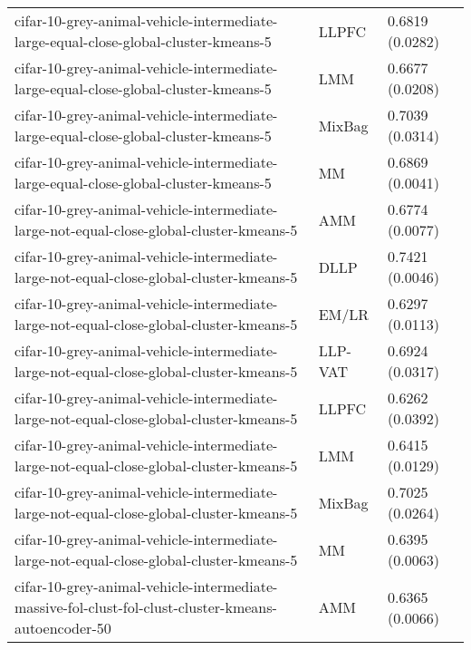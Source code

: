 \begin{longtable}{lll}
                          cifar-10-grey-animal-vehicle-intermediate-large-equal-close-global-cluster-kmeans-5 &     LLPFC &                       0.6819 (0.0282) \\
                          cifar-10-grey-animal-vehicle-intermediate-large-equal-close-global-cluster-kmeans-5 &       LMM &                       0.6677 (0.0208) \\
                          cifar-10-grey-animal-vehicle-intermediate-large-equal-close-global-cluster-kmeans-5 &    MixBag &                       0.7039 (0.0314) \\
                          cifar-10-grey-animal-vehicle-intermediate-large-equal-close-global-cluster-kmeans-5 &        MM &                       0.6869 (0.0041) \\
                      cifar-10-grey-animal-vehicle-intermediate-large-not-equal-close-global-cluster-kmeans-5 &       AMM &                       0.6774 (0.0077) \\
                      cifar-10-grey-animal-vehicle-intermediate-large-not-equal-close-global-cluster-kmeans-5 &      DLLP &                       0.7421 (0.0046) \\
                      cifar-10-grey-animal-vehicle-intermediate-large-not-equal-close-global-cluster-kmeans-5 &     EM/LR &                       0.6297 (0.0113) \\
                      cifar-10-grey-animal-vehicle-intermediate-large-not-equal-close-global-cluster-kmeans-5 &   LLP-VAT &                       0.6924 (0.0317) \\
                      cifar-10-grey-animal-vehicle-intermediate-large-not-equal-close-global-cluster-kmeans-5 &     LLPFC &                       0.6262 (0.0392) \\
                      cifar-10-grey-animal-vehicle-intermediate-large-not-equal-close-global-cluster-kmeans-5 &       LMM &                       0.6415 (0.0129) \\
                      cifar-10-grey-animal-vehicle-intermediate-large-not-equal-close-global-cluster-kmeans-5 &    MixBag &                       0.7025 (0.0264) \\
                      cifar-10-grey-animal-vehicle-intermediate-large-not-equal-close-global-cluster-kmeans-5 &        MM &                       0.6395 (0.0063) \\
          cifar-10-grey-animal-vehicle-intermediate-massive-fol-clust-fol-clust-cluster-kmeans-autoencoder-50 &       AMM &                       0.6365 (0.0066) \\

\end{longtable}
